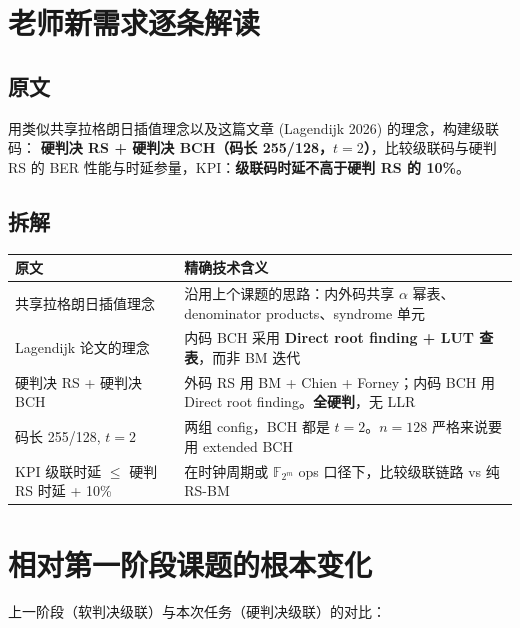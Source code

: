 \documentclass[11pt,a4paper]{article}
\begin{document}
\section{老师新需求逐条解读}

\subsection{原文}

\begin{quotebox}
用类似共享拉格朗日插值理念以及这篇文章 (Lagendijk 2026) 的理念，构建级联码：
\textbf{硬判决 RS + 硬判决 BCH（码长 255/128，$t=2$）}，比较级联码与硬判 RS 的
BER 性能与时延参量，KPI：\textbf{级联码时延不高于硬判 RS 的 10\%}。
\end{quotebox}

\subsection{拆解}

\begin{table}[!ht]
\centering
\begin{tabularx}{\textwidth}{lX}
\toprule
\textbf{原文} & \textbf{精确技术含义} \\
\midrule
共享拉格朗日插值理念 &
沿用上个课题的思路：内外码共享 $\alpha$ 幂表、denominator products、syndrome 单元 \\
Lagendijk 论文的理念 &
内码 BCH 采用 \textbf{Direct root finding + LUT 查表}，而非 BM 迭代 \\
硬判决 RS + 硬判决 BCH &
外码 RS 用 BM + Chien + Forney；内码 BCH 用 Direct root finding。\textbf{全硬判}，无 LLR \\
码长 255/128, $t=2$ &
两组 config，BCH 都是 $t=2$。$n=128$ 严格来说要用 extended BCH \\
KPI 级联时延 $\leq$ 硬判 RS 时延 + 10\% &
在时钟周期或 $\mathbb{F}_{2^m}$ ops 口径下，比较级联链路 vs 纯 RS-BM \\
\bottomrule
\end{tabularx}
\end{table}

\section{相对第一阶段课题的根本变化}

上一阶段（软判决级联）与本次任务（硬判决级联）的对比：
\end{document}
